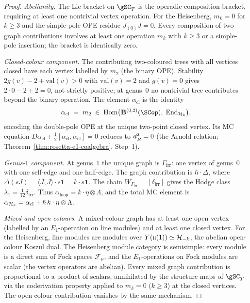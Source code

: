 \begin{proof}
\emph{Abelianity.}\enspace
The Lie bracket on $\gSC_T$ is the operadic composition bracket, requiring at least one nontrivial vertex operation. For the Heisenberg, $m_k = 0$ for $k \ge 3$ and the simple-pole OPE residue $J_{(0)}J = 0$. Every composition of two graph contributions involves at least one operation $m_k$ with $k \ge 3$ or a simple-pole insertion; the bracket is identically zero.

\emph{Closed-colour component.}\enspace
The contributing two-coloured trees with all vertices closed have each vertex labelled by $m_2$ (the binary OPE). Stability $2g(v) - 2 + \mathrm{val}(v) > 0$ with $\mathrm{val}(v) = 2$ and $g(v) = 0$ gives $2 \cdot 0 - 2 + 2 = 0$, not strictly positive; at genus~$0$ no nontrivial tree contributes beyond the binary operation. The element $\alpha_{\mathrm{cl}}$ is the identity
\[
\alpha_{\mathrm{cl}}
\;=\;
m_2 \;\in\;
\Hom\bigl(\mathbf{B}^{(0,2)}(\SCop),\;
\End_{\cH_k}\bigr),
\]
encoding the double-pole OPE at the unique two-point closed vertex. Its MC equation $D\alpha_{\mathrm{cl}} + \tfrac{1}{2}[\alpha_{\mathrm{cl}}, \alpha_{\mathrm{cl}}] = 0$ reduces to $d_{\bar{B}}^2 = 0$ (the Arnold relation; Theorem~\ref{thm:rosetta-e1-coalgebra}, Step~1).

\emph{Genus-$1$ component.}\enspace
At genus~$1$ the unique graph is $\Gamma_{\mathrm{irr}}$: one vertex of genus~$0$ with one self-edge and one half-edge. The graph contribution is $\hbar \cdot \Delta$, where $\Delta(sJ) = \langle J, J \rangle \cdot s\mathbf{1} = k \cdot s\mathbf{1}$. The chain $W_{\Gamma_{\mathrm{irr}}} = [\delta_{\mathrm{irr}}]$ gives the Hodge class $\lambda_1 = \tfrac{1}{12}\delta_{\mathrm{irr}}$. Thus $\alpha_{\mathrm{loop}} = k \cdot \eta \otimes \Lambda$, and the total MC element is $\alpha_{\mathcal{H}_k} = \alpha_{\mathrm{cl}} + \hbar\,k \cdot \eta \otimes \Lambda$.

\emph{Mixed and open colours.}\enspace
A mixed-colour graph has at least one open vertex (labelled by an $E_1$-operation on line modules) and at least one closed vertex. For the Heisenberg, line modules are modules over $Y(\mathfrak{u}(1)) \simeq \mathcal{H}_{-k}$, the abelian open-colour Koszul dual. The Heisenberg module category is semisimple: every module is a direct sum of Fock spaces $\mathcal{F}_\mu$, and the $E_1$-operations on Fock modules are scalar (the vertex operators are abelian). Every mixed graph contribution is proportional to a product of scalars, annihilated by the structure maps of $\gSC_T$ via the coderivation property applied to $m_k = 0$ ($k \ge 3$) at the closed vertices. The open-colour contribution vanishes by the same mechanism.
\end{proof}

